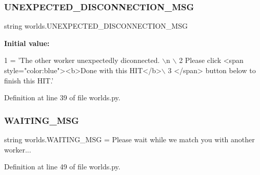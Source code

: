 \subsubsection{\texorpdfstring{U\+N\+E\+X\+P\+E\+C\+T\+E\+D\+\_\+\+D\+I\+S\+C\+O\+N\+N\+E\+C\+T\+I\+O\+N\+\_\+\+M\+SG}{UNEXPECTED\_DISCONNECTION\_MSG}}
{\footnotesize\ttfamily string worlds.\+U\+N\+E\+X\+P\+E\+C\+T\+E\+D\+\_\+\+D\+I\+S\+C\+O\+N\+N\+E\+C\+T\+I\+O\+N\+\_\+\+M\+SG}

{\bfseries Initial value\+:}
\begin{DoxyCode}
1 =  \textcolor{stringliteral}{'The other worker unexpectedly diconnected. \(\backslash\)n \(\backslash\)}
2 \textcolor{stringliteral}{        Please click <span style="color:blue"><b>Done with this HIT</b>\(\backslash\)}
3 \textcolor{stringliteral}{        </span> button below to finish this HIT.'}
\end{DoxyCode}


Definition at line 39 of file worlds.\+py.

\mbox{\label{namespaceworlds_a5d7e0b829b14d5c6c8156bea77a33e07}} 
\subsubsection{\texorpdfstring{W\+A\+I\+T\+I\+N\+G\+\_\+\+M\+SG}{WAITING\_MSG}}
{\footnotesize\ttfamily string worlds.\+W\+A\+I\+T\+I\+N\+G\+\_\+\+M\+SG = \textquotesingle{}Please wait while we match you with another worker...\textquotesingle{}}



Definition at line 49 of file worlds.\+py.

